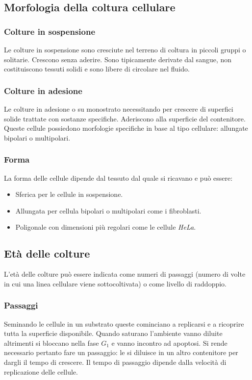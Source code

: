 	\subsection{Morfologia della coltura cellulare}

		\subsubsection{Colture in sospensione}
		Le colture in sospensione sono cresciute nel terreno di coltura in piccoli gruppi o solitarie.
		Crescono senza aderire.
		Sono tipicamente derivate dal sangue, non costituiscono tessuti solidi e sono libere di circolare nel fluido.

		\subsubsection{Colture in adesione}
		Le colture in adesione o su monostrato necessitando per crescere di superfici solide trattate con sostanze specifiche.
		Aderiscono alla superficie del contenitore.
		Queste cellule possiedono morfologie specifiche in base al tipo cellulare: allungate bipolari o multipolari. 
		
		\subsubsection{Forma}
		La forma delle cellule dipende dal tessuto dal quale si ricavano e pu\`o essere:
		\begin{itemize}
			\item Sferica per le cellule in sospensione.
			\item Allungata per cellula bipolari o multipolari come i fibroblasti.
			\item Poligonale con dimensioni pi\`u regolari come le cellule \emph{HeLa}.
		\end{itemize}

	\subsection{Et\`a delle colture}
	L'et\`a delle colture pu\`o essere indicata come numeri di passaggi (numero di volte in cui una linea cellulare viene sottocoltivata) o come livello di raddoppio.

		\subsubsection{Passaggi}
		Seminando le cellule in un substrato queste cominciano a replicarsi e a ricoprire tutta la superficie disponibile.
		Quando saturano l'ambiente vanno diluite altrimenti si bloccano nella fase $G_1$ e vanno incontro ad apoptosi. 
		Si rende necessario pertanto fare un passaggio: le si diluisce in un altro contenitore per dargli il tempo di crescere.
		Il tempo di passaggio dipende dalla velocit\`a di replicazione delle cellule. 

